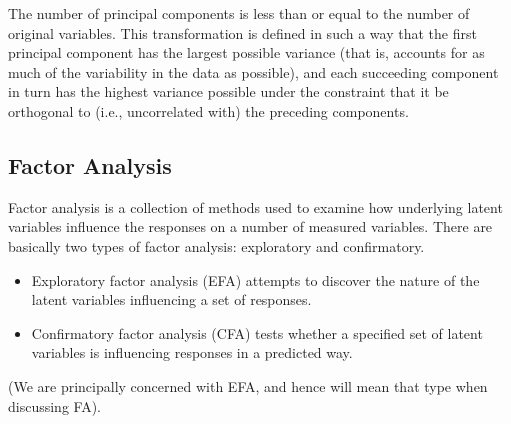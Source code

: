 The number of principal components is less than or equal to the number of original variables. This transformation is defined in such a way that the first principal component has the largest possible variance (that is, accounts for as much of the variability in the data as possible), and each succeeding component in turn has the highest variance possible under the constraint that it be orthogonal to (i.e., uncorrelated with) the preceding components.


\subsection{Factor Analysis}
Factor analysis is a collection of methods used to examine how underlying latent variables influence the
responses on a number of measured variables.
There are basically two types of factor analysis: exploratory and confirmatory.
\begin{itemize}
\item Exploratory factor analysis (EFA) attempts to discover the nature of the latent variables influencing
a set of responses.
\item Confirmatory factor analysis (CFA) tests whether a specified set of latent variables is influencing responses in a predicted way.
\end{itemize}
(We are principally concerned with EFA, and hence will mean that type when discussing FA).


